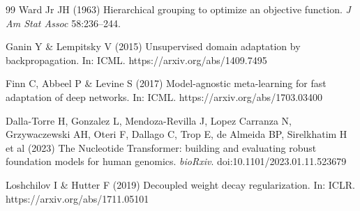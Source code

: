 \documentclass[12pt]{article}
\begin{document}
\begin{singlespacing}
\begin{thebibliography}{99}
Ward Jr JH (1963) Hierarchical grouping to optimize an objective function. \textit{J Am Stat Assoc} 58:236--244.

Ganin Y \& Lempitsky V (2015) Unsupervised domain adaptation by backpropagation. In: ICML. https://arxiv.org/abs/1409.7495

Finn C, Abbeel P \& Levine S (2017) Model-agnostic meta-learning for fast adaptation of deep networks. In: ICML. https://arxiv.org/abs/1703.03400

Dalla-Torre H, Gonzalez L, Mendoza-Revilla J, Lopez Carranza N, Grzywaczewski AH, Oteri F, Dallago C, Trop E, de Almeida BP, Sirelkhatim H et al (2023) The Nucleotide Transformer: building and evaluating robust foundation models for human genomics. \textit{bioRxiv}. doi:10.1101/2023.01.11.523679

Loshchilov I \& Hutter F (2019) Decoupled weight decay regularization. In: ICLR. https://arxiv.org/abs/1711.05101

\end{thebibliography}
\end{singlespacing}
\end{document}
